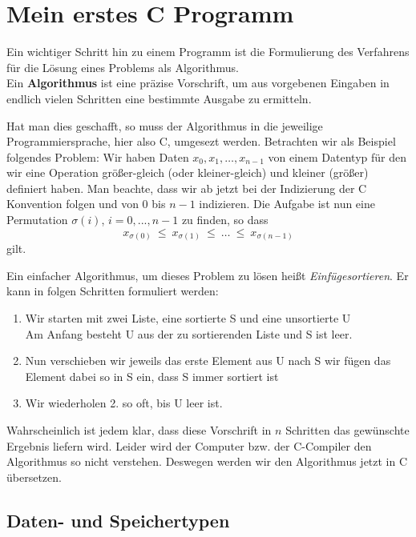 \section{Mein erstes C Programm}

Ein wichtiger Schritt hin zu einem Programm ist die Formulierung des Verfahrens für die Lösung eines Problems als Algorithmus.\\
Ein \textbf{Algorithmus} ist eine präzise Vorschrift, um aus vorgebenen
Eingaben in endlich vielen Schritten eine bestimmte Ausgabe zu
ermitteln.

Hat man dies geschafft, so muss der Algorithmus in die jeweilige Programmiersprache, hier also C, umgesezt werden.
Betrachten wir als Beispiel folgendes Problem:
Wir haben Daten $x_0, x_1,\ldots,x_{n-1}$ von einem Datentyp für den wir eine Operation größer-gleich (oder kleiner-gleich) und kleiner (größer) definiert haben.
Man beachte, dass wir ab jetzt bei der Indizierung der C Konvention folgen und von $0$ bis $n-1$ indizieren.
Die Aufgabe ist nun eine Permutation $\sigma(i)$, $i=0,...,n-1$ zu finden, so dass
\[
x_{\sigma(0)}\ \leq\ x_{\sigma(1)}\ \leq\ \ldots\ \leq\ x_{\sigma(n-1)}
\]
gilt.

Ein einfacher Algorithmus, um dieses Problem zu lösen heißt \emph{Einfügesortieren}.
Er kann in folgen Schritten formuliert werden:
\begin{enumerate}
\item Wir starten mit zwei Liste, eine sortierte S und eine unsortierte U\\
  Am Anfang besteht U aus der zu sortierenden Liste und S ist leer.
\item Nun verschieben wir jeweils das erste Element aus U nach S
  wir fügen das Element dabei so in S ein, dass S immer sortiert ist
 \item Wir wiederholen 2. so oft, bis U leer ist.
\end{enumerate}
Wahrscheinlich ist jedem klar, dass diese Vorschrift in $n$ Schritten das gewünschte Ergebnis liefern wird.
Leider wird der Computer bzw. der C-Compiler den Algorithmus so nicht verstehen.
Deswegen werden wir den Algorithmus jetzt in C übersetzen.

\subsection{Daten- und Speichertypen}

